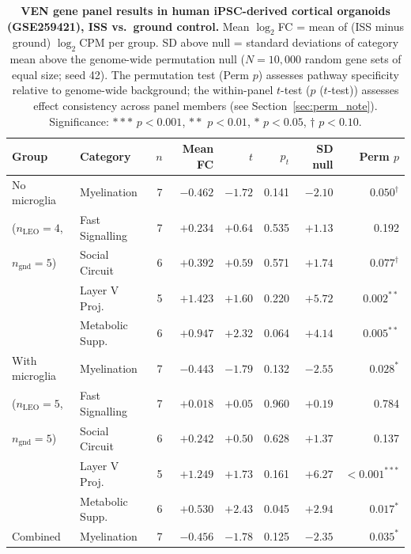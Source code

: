 \documentclass[11pt]{article}
\begin{document}
\begin{table}[t]
\centering
\caption{\textbf{VEN gene panel results in human iPSC-derived cortical
organoids (GSE259421), ISS vs.\ ground control.}
Mean $\log_2$FC = mean of (ISS minus ground) $\log_2$CPM per group.
SD above null = standard deviations of category mean above the
genome-wide permutation null ($N=10{,}000$ random gene sets of equal
size; seed 42).
The permutation test (Perm $p$) assesses pathway specificity relative to
genome-wide background; the within-panel $t$-test ($p$ ($t$-test)) assesses
effect consistency across panel members (see Section~\ref{sec:perm_note}).
Significance: $***$ $p<0.001$, $**$ $p<0.01$, $*$ $p<0.05$,
$\dagger$ $p<0.10$.}
\label{tab:organoid}
\vspace{4pt}
\footnotesize
\setlength{\tabcolsep}{4pt}
\begin{tabular}{llrrrrrr}
\toprule
\textbf{Group} & \textbf{Category} & \textbf{$n$} &
\textbf{Mean FC} & \textbf{$t$} & \textbf{$p_{t}$} &
\textbf{SD null} & \textbf{Perm $p$}\\
\midrule
No microglia               & Myelination       & 7 & $-0.462$ & $-1.72$ & 0.141 & $-2.10$ & $0.050^\dagger$ \\
($n_\text{LEO}=4$,         & Fast Signalling   & 7 & $+0.234$ & $+0.64$ & 0.535 & $+1.13$ & 0.192 \\
$n_\text{gnd}=5$)          & Social Circuit    & 6 & $+0.392$ & $+0.59$ & 0.571 & $+1.74$ & $0.077^\dagger$ \\
                           & Layer V Proj.     & 5 & $+1.423$ & $+1.60$ & 0.220 & $+5.72$ & $0.002^{**}$ \\
                           & Metabolic Supp.   & 6 & $+0.947$ & $+2.32$ & 0.064 & $+4.14$ & $0.005^{**}$ \\
\midrule
With microglia             & Myelination       & 7 & $-0.443$ & $-1.79$ & 0.132 & $-2.55$ & $0.028^{*}$ \\
($n_\text{LEO}=5$,         & Fast Signalling   & 7 & $+0.018$ & $+0.05$ & 0.960 & $+0.19$ & 0.784 \\
$n_\text{gnd}=5$)          & Social Circuit    & 6 & $+0.242$ & $+0.50$ & 0.628 & $+1.37$ & 0.137 \\
                           & Layer V Proj.     & 5 & $+1.249$ & $+1.73$ & 0.161 & $+6.27$ & $<0.001^{***}$ \\
                           & Metabolic Supp.   & 6 & $+0.530$ & $+2.43$ & 0.045 & $+2.94$ & $0.017^{*}$ \\
\midrule
Combined                   & Myelination       & 7 & $-0.456$ & $-1.78$ & 0.125 & $-2.35$ & $0.035^{*}$ \\

\end{tabular}
\end{table}
\end{document}
